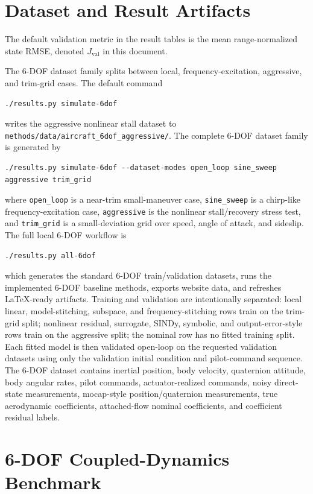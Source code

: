 \documentclass[11pt]{article}
\begin{document}
\section{Dataset and Result Artifacts}

The default validation metric in the result tables is the mean range-normalized state RMSE, denoted $J_{\mathrm{val}}$ in this document.

The 6-DOF dataset family splits between local, frequency-excitation, aggressive, and trim-grid cases. The default command
\begin{verbatim}
./results.py simulate-6dof
\end{verbatim}
writes the aggressive nonlinear stall dataset to \texttt{methods/data/aircraft\_6dof\_aggressive/}. The complete 6-DOF dataset family is generated by
\begin{verbatim}
./results.py simulate-6dof --dataset-modes open_loop sine_sweep aggressive trim_grid
\end{verbatim}
where \texttt{open\_loop} is a near-trim small-maneuver case, \texttt{sine\_sweep} is a chirp-like frequency-excitation case, \texttt{aggressive} is the nonlinear stall/recovery stress test, and \texttt{trim\_grid} is a small-deviation grid over speed, angle of attack, and sideslip. The full local 6-DOF workflow is
\begin{verbatim}
./results.py all-6dof
\end{verbatim}
which generates the standard 6-DOF train/validation datasets, runs the implemented 6-DOF baseline methods, exports website data, and refreshes LaTeX-ready artifacts. Training and validation are intentionally separated: local linear, model-stitching, subspace, and frequency-stitching rows train on the trim-grid split; nonlinear residual, surrogate, SINDy, symbolic, and output-error-style rows train on the aggressive split; the nominal row has no fitted training split. Each fitted model is then validated open-loop on the requested validation datasets using only the validation initial condition and pilot-command sequence. The 6-DOF dataset contains inertial position, body velocity, quaternion attitude, body angular rates, pilot commands, actuator-realized commands, noisy direct-state measurements, mocap-style position/quaternion measurements, true aerodynamic coefficients, attached-flow nominal coefficients, and coefficient residual labels.

\section{6-DOF Coupled-Dynamics Benchmark}
\label{sec:prob}
\end{document}
